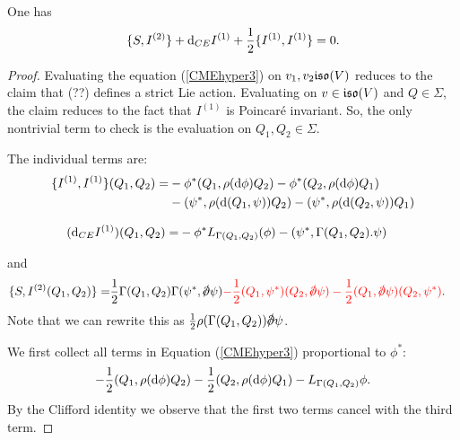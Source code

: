 \documentclass[10pt, oneside]{article}
\begin{document}
\begin{lemma} 
One has
\begin{equation}\label{CMEhyper3}
\{S, I^{(2)}\} + {\rm d}_{CE} I^{(1)} + \frac{1}{2} \{I^{(1)}, I^{(1)}\} = 0 .
\end{equation}
\end{lemma}
\begin{proof}
Evaluating the equation (\ref{CMEhyper3}) on $v_1,v_2 \mathfrak{iso}(V)$ reduces to the claim that (??) defines a strict Lie action. 
Evaluating on $v \in \mathfrak{iso}(V)$ and $Q \in \Sigma$, the claim reduces to the fact that $I^{(1)}$ is Poincar\'{e} invariant.
So, the only nontrivial term to check is the evaluation on $Q_1,Q_2 \in \Sigma$. 

The individual terms are:
\begin{align*}
\{I^{(1)}, I^{(1)}\}(Q_1, Q_2) = & - \phi^* (Q_1, \rho({\rm d} \phi) Q_2) - \phi^* (Q_2, \rho({\rm d} \phi)Q_1) \\ &  -  (\psi^*, \rho({\rm d}(Q_1,\psi))Q_2) - (\psi^*, \rho({\rm d}(Q_2, \psi)) Q_1) 
\end{align*}

\begin{align*}
({\rm d}_{CE}I^{(1)})(Q_1,Q_2) = & - \phi^* L_{\Gamma(Q_1,Q_2)} (\phi) - (\psi^*, \Gamma(Q_1,Q_2) . \psi)
\end{align*}

and
\begin{align*}
\{S, I^{(2)}(Q_1,Q_2)\} = & \frac{1}{2} \Gamma(Q_1,Q_2) \Gamma(\psi^*, \sd \dd \psi) \textcolor{red}{- \frac{1}{2} (Q_1, \psi^*) (Q_2, \sd \dd \psi) - \frac{1}{2} (Q_1, \sd \dd \psi) (Q_2, \psi^*) }.
\end{align*}
Note that we can rewrite this as $\frac{1}{2} \rho(\Gamma(Q_1, Q_2)) \sd \dd \psi$. 

We first collect all terms in Equation (\ref{CMEhyper3}) proportional to $\phi^*$:
\[
- \frac{1}{2} (Q_1, \rho({\rm d}\phi) Q_2) - \frac{1}{2} (Q_2, \rho({\rm d} \phi) Q_1) - L_{\Gamma(Q_1,Q_2)} \phi .
\]
By the Clifford identity
 we observe that the first two terms cancel with the third term.  


\end{proof}
\end{document}
